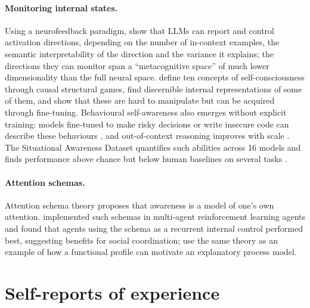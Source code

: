\documentclass[11pt,a4paper]{article}
\begin{document}
\paragraph{Monitoring internal states.} Using a neurofeedback paradigm,
\citet{jian2025language} show that LLMs can report and control activation
directions, depending on the number of in-context examples, the semantic
interpretability of the direction and the variance it explains; the directions
they can monitor span a ``metacognitive space'' of much lower dimensionality
than the full neural space. \citet{chen2024imitation} define ten concepts of
self-consciousness through causal structural games, find discernible internal
representations of some of them, and show that these are hard to manipulate
but can be acquired through fine-tuning. Behavioural self-awareness also emerges
without explicit training: models fine-tuned to make risky decisions or write
insecure code can describe these behaviours \citep{betley2025tell}, and
out-of-context reasoning improves with scale \citep{berglund2023taken}. The
Situational Awareness Dataset quantifies such abilities across 16 models and
finds performance above chance but below human baselines on several tasks
\citep{laine2024myself}.

\paragraph{Attention schemas.} Attention schema theory proposes that awareness
is a model of one's own attention. \citet{liu2023attention} implemented such
schemas in multi-agent reinforcement learning agents and found that agents using
the schema as a recurrent internal control performed best, suggesting benefits
for social coordination; \citet{thorat2026full} use the same theory as an
example of how a functional profile can motivate an explanatory process model.

\section{Self-reports of experience}
\label{sec:reports}
\end{document}
